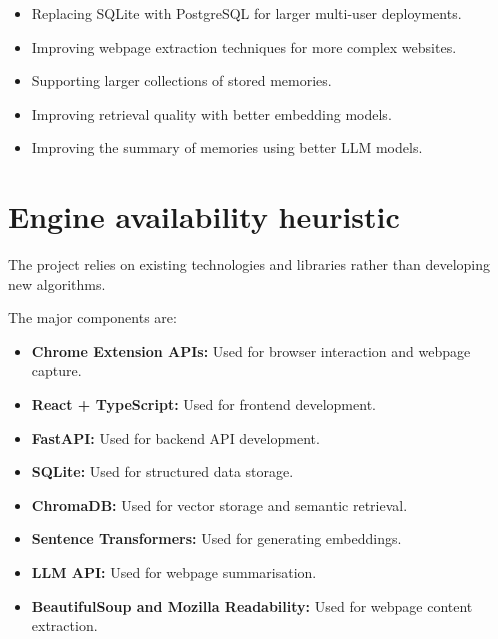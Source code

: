 \documentclass[11pt,a4paper]{article}
\begin{document}
\begin{itemize}[leftmargin=0.7cm]

\item Replacing SQLite with PostgreSQL for larger multi-user deployments.

\item Improving webpage extraction techniques for more complex websites.

\item Supporting larger collections of stored memories.

\item Improving retrieval quality with better embedding models.

\item Improving the summary of memories using better LLM models.

\end{itemize}


\section{Engine availability heuristic}

The project relies on existing technologies and libraries rather than developing new algorithms.

The major components are:

\begin{itemize}[leftmargin=0.7cm]

\item \textbf{Chrome Extension APIs:} Used for browser interaction and webpage capture.

\item \textbf{React + TypeScript:} Used for frontend development.

\item \textbf{FastAPI:} Used for backend API development.

\item \textbf{SQLite:} Used for structured data storage.

\item \textbf{ChromaDB:} Used for vector storage and semantic retrieval.

\item \textbf{Sentence Transformers:} Used for generating embeddings.

\item \textbf{LLM API:} Used for webpage summarisation.

\item \textbf{BeautifulSoup and Mozilla Readability:} Used for webpage content extraction.

\end{itemize}
\end{document}
